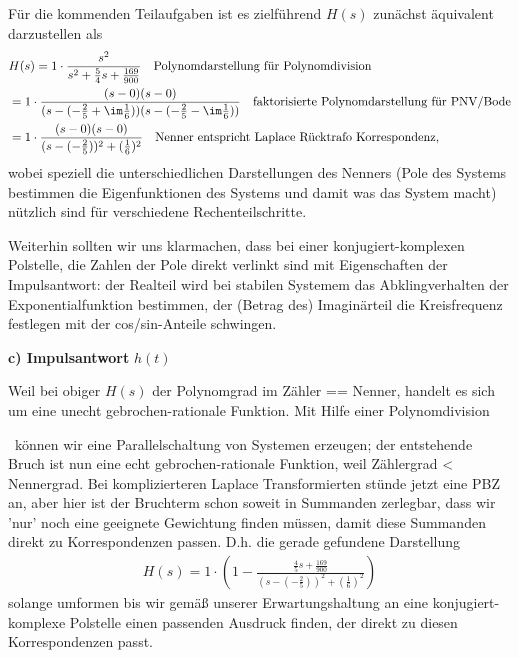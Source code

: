\begin{ExCalc}
Für die kommenden Teilaufgaben ist es zielführend $H(s)$ zunächst äquivalent darzustellen als
\begin{align}
&H(s) = 1 \cdot \frac{s^2}{s^2 + \frac{5}{4} s + \frac{169}{900}}\quad\text{Polynomdarstellung für Polynomdivision}\\
&= 1 \cdot \frac{(s-0)(s-0)}{(s-(-\frac{2}{5} + \im \frac{1}{6}))(s-(-\frac{2}{5} - \im \frac{1}{6}))}\quad\text{faktorisierte Polynomdarstellung für PNV/Bode}\\
&= 1 \cdot \frac{(s-0)(s-0)}{(s-(-\frac{2}{5}))^2+(\frac{1}{6})^2}\quad\text{Nenner entspricht Laplace Rücktrafo Korrespondenz},
\end{align}
wobei speziell die unterschiedlichen Darstellungen des Nenners (Pole des Systems bestimmen die Eigenfunktionen des Systems und damit was das System macht) nützlich sind für verschiedene Rechenteilschritte.

Weiterhin sollten wir uns klarmachen, dass bei einer konjugiert-komplexen Polstelle, die Zahlen der Pole direkt verlinkt sind mit Eigenschaften der Impulsantwort: der Realteil wird bei stabilen Systemem das Abklingverhalten der Exponentialfunktion bestimmen, der (Betrag des) Imaginärteil die Kreisfrequenz festlegen mit der cos/sin-Anteile schwingen.

\noindent \textbf{c) Impulsantwort} $h(t)$

Weil bei obiger $H(s)$ der Polynomgrad im Zähler == Nenner, handelt es sich um eine unecht gebrochen-rationale Funktion. Mit Hilfe einer Polynomdivision

\,  \quad können wir eine Parallelschaltung von Systemen erzeugen; der entstehende Bruch ist nun eine echt gebrochen-rationale Funktion, weil Zählergrad < Nennergrad.
%
Bei komplizierteren Laplace Transformierten stünde jetzt eine PBZ an, aber hier ist der Bruchterm schon soweit in Summanden zerlegbar, dass wir 'nur' noch eine geeignete Gewichtung finden müssen, damit diese Summanden direkt zu Korrespondenzen passen.
D.h. die gerade gefundene Darstellung
\begin{align}
H(s) = 1 \cdot \left(1 - \frac{\frac{4}{5}s + \frac{169}{900}}{(s-(-\frac{2}{5}))^2+(\frac{1}{6})^2}\right)
\end{align}
solange umformen bis wir gemäß unserer Erwartungshaltung an eine konjugiert-komplexe Polstelle einen passenden Ausdruck finden, der direkt zu diesen Korrespondenzen passt.


\end{ExCalc}
